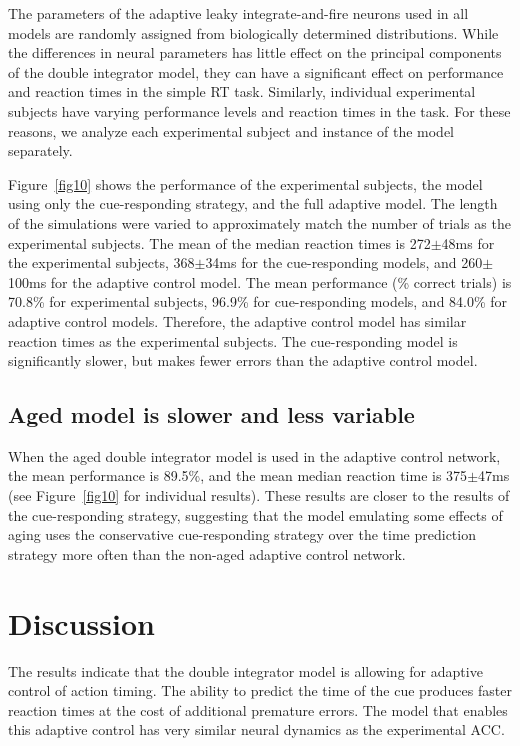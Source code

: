 \documentclass[11pt]{article}
\begin{document}
The parameters of the adaptive leaky integrate-and-fire neurons
used in all models are randomly assigned
from biologically determined distributions.
While the differences in neural parameters
has little effect on the principal components
of the double integrator model,
they can have a significant effect
on performance and reaction times
in the simple RT task.
Similarly, individual experimental subjects
have varying performance levels and reaction times
in the task.
For these reasons, we analyze
each experimental subject and instance of the model separately.

Figure~\ref{fig10} shows the performance
of the experimental subjects,
the model using only the cue-responding strategy,
and the full adaptive model.
The length of the simulations were
varied to approximately match the number of trials
as the experimental subjects.
The mean of the median reaction times
is 272$\pm$48ms for the experimental subjects,
368$\pm$34ms for the cue-responding models,
and 260$\pm$100ms for the adaptive control model.
The mean performance (\% correct trials) is
70.8\% for experimental subjects,
96.9\% for cue-responding models,
and 84.0\% for adaptive control models.
Therefore, the adaptive control model
has similar reaction times as the experimental subjects.
The cue-responding model is significantly slower,
but makes fewer errors than the adaptive control model.

\subsection{Aged model is slower and less variable}

When the aged double integrator model
is used in the adaptive control network,
the mean performance is 89.5\%,
and the mean median reaction time
is 375$\pm$47ms (see Figure~\ref{fig10} for individual results).
These results are closer
to the results of the cue-responding strategy,
suggesting that the model emulating
some effects of aging
uses the conservative cue-responding strategy
over the time prediction strategy
more often than the non-aged adaptive control network.

\section{Discussion}

The results indicate that the double integrator model
is allowing for adaptive control of action timing.
The ability to predict the time of the cue
produces faster reaction times at the cost
of additional premature errors.
The model that enables this adaptive control
has very similar neural dynamics
as the experimental ACC.
\end{document}
